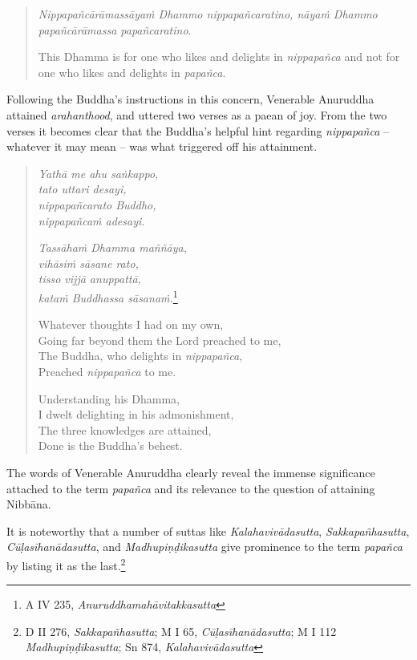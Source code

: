 \begin{quote}
\emph{Nippapañcārāmassāyaṁ Dhammo nippapañcaratino, nāyaṁ Dhammo papañcārāmassa papañcaratino}.

This Dhamma is for one who likes and delights in \emph{nippapañca} and not for one who likes and delights in \emph{papañca}.
\end{quote}

Following the Buddha's instructions in this concern, Venerable Anuruddha attained \emph{arahanthood}, and uttered two verses as a paean of joy. From the two verses it becomes clear that the Buddha's helpful hint regarding \emph{nippapañca} -- whatever it may mean -- was what triggered off his attainment.

\begin{quote}
\emph{Yathā me ahu saṅkappo,}\\
\emph{tato uttari desayi,}\\
\emph{nippapañcarato Buddho,}\\
\emph{nippapañcaṁ adesayi.}

\emph{Tassāhaṁ Dhamma maññāya,}\\
\emph{vihāsiṁ sāsane rato,}\\
\emph{tisso vijjā anuppattā,}\\
\emph{kataṁ Buddhassa sāsanaṁ.}\footnote{A IV 235, \emph{Anuruddhamahāvitakkasutta}}

Whatever thoughts I had on my own,\\
Going far beyond them the Lord preached to me,\\
The Buddha, who delights in \emph{nippapañca},\\
Preached \emph{nippapañca} to me.

Understanding his Dhamma,\\
I dwelt delighting in his admonishment,\\
The three knowledges are attained,\\
Done is the Buddha's behest.
\end{quote}

The words of Venerable Anuruddha clearly reveal the immense significance attached to the term \emph{papañca} and its relevance to the question of attaining Nibbāna.

It is noteworthy that a number of suttas like \emph{Kalahavivādasutta}, \emph{Sakkapañhasutta}, \emph{Cūḷasīhanādasutta}, and \emph{Madhupiṇḍikasutta} give prominence to the term \emph{papañca} by listing it as the last.\footnote{D II 276, \emph{Sakkapañhasutta}; M I 65, \emph{Cūḷasīhanādasutta}; M I 112 \emph{Madhupiṇḍikasutta}; Sn 874, \emph{Kalahavivādasutta}}

